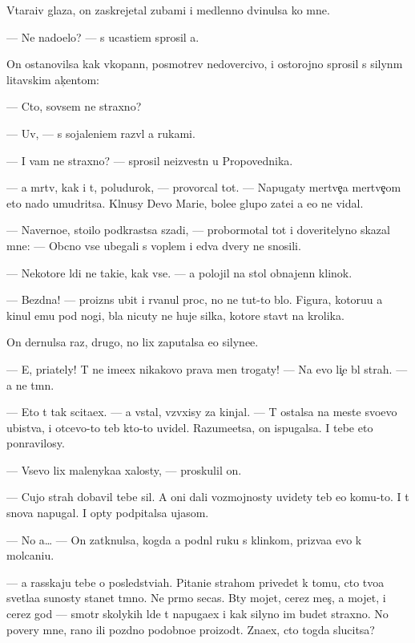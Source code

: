 \documentclass[10pt]{book}
\begin{document}
V{\yi}tara{\x}iv glaza, on zaskrejetal zubami i medlenno dvinulsa ko mne.

— Ne nado{\y}elo? — s ucasti{\y}em sprosil {\y}a.

On ostanovilsa kak vkopann{\yi}{\y}, posmotrev nedovercivo, i ostorojno sprosil s silyn{\yi}m litavskim ak{\c}entom:

— Cto, sovsem ne straxno?

— Uv{\yi}, — s sojaleni{\y}em razv{\e}l {\y}a rukami.

— I vam ne straxno? — sprosil ne{\y}izvestn{\yi}{\y} u Propovednika.

— {\Y}a m{\e}rtv, kak i t{\yi}, poludurok, — provorcal tot. — Napugaty mertve{\c}a mertve{\c}om eto nado umudritsa. Kl{\ia}nusy Devo{\y} Mari{\y}e{\y}, bole{\y}e glupo{\y} zate{\y}i {\y}a {\y}e{\x}o ne vidal.

— Naverno{\y}e, sto{\y}ilo podkrastsa szadi, — probormotal tot i doveritelyno skazal mne: — Ob{\yi}cno vse ubegali s voplem i {\y}edva dvery ne snosili.

— Nekotor{\yi}{\y}e l{\iu}di ne taki{\y}e, kak vse. — {\Y}a polojil na stol obnajenn{\yi}{\y} klinok.

— Bezdna! — proizn{\e}s ubit{\yi}{\y} i rvanul proc, no ne tut-to b{\yi}lo. Figura, kotoru{\y}u {\y}a kinul {\y}emu pod nogi, b{\yi}la nicuty ne huje silka, kotor{\yi}{\y}e stav{\ia}t na krolika.

On dernulsa raz, drugo{\y}, no lix zaputalsa {\y}e{\x}o silyne{\y}e.

— E{\y}, pri{\y}ately! T{\yi} ne ime{\y}ex nikakovo prava men{\ia} trogaty! — Na {\y}evo li{\c}e b{\yi}l strah. — {\Y}a ne t{\e}mn{\yi}{\y}.

— Eto t{\yi} tak scita{\y}ex. — {\Y}a vstal, vz{\ia}vxisy za kinjal. — T{\yi} ostalsa na meste svo{\y}evo ubi{\y}stva, i otcevo-to teb{\ia} kto-to uvidel. Razume{\y}etsa, on ispugalsa. I tebe eto ponravilosy.

— Vsevo lix malenyka{\y}a xalosty, — proskulil on.

— Cujo{\y} strah dobavil tebe sil. A oni dali vozmojnosty uvidety teb{\ia} {\y}e{\x}o komu-to. I t{\yi} snova napugal. I op{\ia}ty podpitalsa ujasom.

— No {\y}a… — On zatknulsa, kogda {\y}a podn{\ia}l ruku s klinkom, priz{\yi}va{\y}a {\y}evo k molcani{\y}u.

— {\Y}a rasskaju tebe o posledstvi{\y}ah. Pitani{\y}e strahom privedet k tomu, cto tvo{\y}a svetla{\y}a su{\x}nosty stanet t{\e}mno{\y}. Ne pr{\ia}mo se{\y}cas. B{\yi}ty mojet, cerez mes{\ia}{\c}, a mojet, i cerez god — smotr{\ia} skolykih l{\iu}de{\y} t{\yi} napuga{\y}ex i kak silyno im budet straxno. No povery mne, rano ili pozdno podobno{\y}e proizo{\y}d{\e}t. Zna{\y}ex, cto togda slucitsa?
\end{document}
